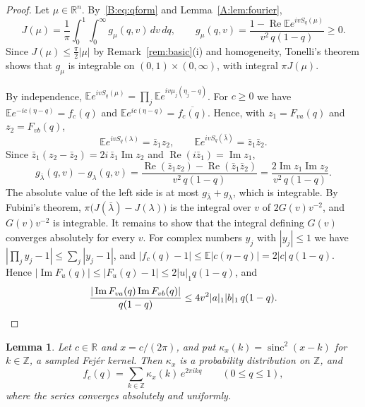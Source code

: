 \documentclass[11pt]{amsart}
\newtheorem{lemma}[theorem]{Lemma}
\theoremstyle{remark}
\numberwithin{equation}{section}
\newcommand{\R}{\mathbb{R}}
\newcommand{\E}{\mathbb{E}}
\begin{document}
\begin{proof}
Let $\mu\in\R^n$. By~\eqref{B:eq:qform} and Lemma~\ref{A:lem:fourier},
\[
J(\mu)=\frac1\pi\int_0^1\int_0^\infty g_\mu(q,v)\,dv\,dq,\qquad g_\mu(q,v)=\frac{1-\operatorname{Re}\E e^{ivS_q(\mu)}}{v^2\,q(1-q)}\ge0.
\]
Since $J(\mu)\le\frac\pi2|\mu|$ by Remark~\ref{rem:basic}(i) and homogeneity, Tonelli's theorem shows that $g_\mu$ is integrable on $(0,1)\times(0,\infty)$, with integral $\pi J(\mu)$.

By independence, $\E e^{ivS_q(\mu)}=\prod_j\E e^{iv\mu_j(\eta_j-q)}$. For $c\ge0$ we have $\E e^{-ic(\eta-q)}=f_c(q)$ and $\E e^{ic(\eta-q)}=\overline{f_c(q)}$. Hence, with $z_1=F_{va}(q)$ and $z_2=F_{vb}(q)$,
\[
\E e^{ivS_q(\lambda)}=\bar z_1z_2,\qquad \E e^{ivS_q(\bar\lambda)}=\bar z_1\bar z_2.
\]
Since $\bar z_1(z_2-\bar z_2)=2i\,\bar z_1\operatorname{Im}z_2$ and $\operatorname{Re}(i\bar z_1)=\operatorname{Im}z_1$,
\[
g_{\bar\lambda}(q,v)-g_\lambda(q,v)=\frac{\operatorname{Re}(\bar z_1z_2)-\operatorname{Re}(\bar z_1\bar z_2)}{v^2\,q(1-q)}=\frac{2\operatorname{Im}z_1\operatorname{Im}z_2}{v^2\,q(1-q)}.
\]
The absolute value of the left side is at most $g_{\bar\lambda}+g_\lambda$, which is integrable. By Fubini's theorem, $\pi\bigl(J(\bar\lambda)-J(\lambda)\bigr)$ is the integral over $v$ of $2G(v)v^{-2}$, and $G(v)v^{-2}$ is integrable. It remains to show that the integral defining $G(v)$ converges absolutely for every $v$. For complex numbers $y_j$ with $|y_j|\le1$ we have $|\prod_jy_j-1|\le\sum_j|y_j-1|$, and $|f_c(q)-1|\le\E|c(\eta-q)|=2|c|\,q(1-q)$. Hence $|\operatorname{Im}F_u(q)|\le|F_u(q)-1|\le2|u|_1q(1-q)$, and
\[
\frac{|\operatorname{Im}F_{va}(q)\operatorname{Im}F_{vb}(q)|}{q(1-q)}\le4v^2|a|_1|b|_1\,q(1-q).\qedhere
\]
\end{proof}

\begin{lemma}\label{B:lem:fejer}
Let $c\in\R$ and $x=c/(2\pi)$, and put $\kappa_x(k)=\operatorname{sinc}^2(x-k)$ for $k\in\mathbb Z$, a sampled Fej\'er kernel. Then $\kappa_x$ is a probability distribution on $\mathbb Z$, and
\[
f_c(q)=\sum_{k\in\mathbb Z}\kappa_x(k)\,e^{2\pi ikq}\qquad(0\le q\le1),
\]
where the series converges absolutely and uniformly.
\end{lemma}
\end{document}
